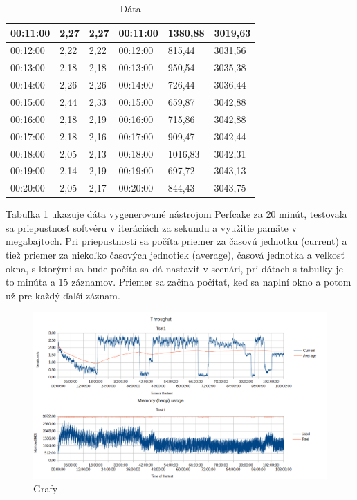 \begin{table}[htb]
\begin{tabular}{|l|l|l|l|l|l|}
00:11:00      & 2,27             & 2,27             & 00:11:00      & 1380,88       & 3019,63        \\ \hline
00:12:00      & 2,22             & 2,22             & 00:12:00      & 815,44        & 3031,56        \\ \hline
00:13:00      & 2,18             & 2,18             & 00:13:00      & 950,54        & 3035,38        \\ \hline
00:14:00      & 2,26             & 2,26             & 00:14:00      & 726,44        & 3036,44        \\ \hline
00:15:00      & 2,44             & 2,33             & 00:15:00      & 659,87        & 3042,88        \\ \hline
00:16:00      & 2,18             & 2,19             & 00:16:00      & 715,86        & 3042,88        \\ \hline
00:17:00      & 2,18             & 2,16             & 00:17:00      & 909,47        & 3042,44        \\ \hline
00:18:00      & 2,05             & 2,13             & 00:18:00      & 1016,83       & 3042,31        \\ \hline
00:19:00      & 2,14             & 2,19             & 00:19:00      & 697,72        & 3043,13        \\ \hline
00:20:00      & 2,05             & 2,17             & 00:20:00      & 844,43        & 3043,75        \\ \hline
\end{tabular}
\caption{Dáta}\label{tab:Data}
\end{table}

Tabuľka  \ref{tab:Data} ukazuje dáta vygenerované nástrojom Perfcake za 20 minút, testovala sa priepustnosť softvéru v iteráciách za sekundu a využitie pamäte v megabajtoch. Pri priepustnosti sa počíta priemer za časovú jednotku (current) a tiež priemer za niekoľko časových jednotiek (average), časová jednotka a veľkosť okna, s ktorými sa bude počíta sa 
dá nastaviť v scenári, pri dátach s tabuľky je to minúta a 15 záznamov. Priemer sa začína počítať, keď sa naplní okno a potom už pre každý ďalší záznam. 

\begin{figure}[!htb]
\centering
\includegraphics[scale=0.70, angle =90]{graphs.png}
\caption{Grafy}\label{grafy}
\end{figure}


